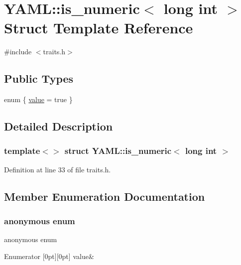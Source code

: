 \hypertarget{struct_y_a_m_l_1_1is__numeric_3_01long_01int_01_4}{}\section{Y\+A\+ML\+::is\+\_\+numeric$<$ long int $>$ Struct Template Reference}
\label{struct_y_a_m_l_1_1is__numeric_3_01long_01int_01_4}


{\ttfamily \#include $<$traits.\+h$>$}

\subsection*{Public Types}
\begin{DoxyCompactItemize}
\item 
enum \{ \mbox{\hyperlink{struct_y_a_m_l_1_1is__numeric_3_01long_01int_01_4_ad56b2b81b92aff41d3332b5f5948cccbac16c46732f20bdae796990235b2bb440}{value}} = true
 \}
\end{DoxyCompactItemize}


\subsection{Detailed Description}
\subsubsection*{template$<$$>$\newline
struct Y\+A\+M\+L\+::is\+\_\+numeric$<$ long int $>$}



Definition at line 33 of file traits.\+h.



\subsection{Member Enumeration Documentation}
\mbox{\label{struct_y_a_m_l_1_1is__numeric_3_01long_01int_01_4_ad56b2b81b92aff41d3332b5f5948cccb}} 
\subsubsection{\texorpdfstring{anonymous enum}{anonymous enum}}
{\footnotesize\ttfamily anonymous enum}

\begin{DoxyEnumFields}{Enumerator}
[0pt][0pt]{}\mbox{\label{struct_y_a_m_l_1_1is__numeric_3_01long_01int_01_4_ad56b2b81b92aff41d3332b5f5948cccbac16c46732f20bdae796990235b2bb440}} 
value&\\
\hline

\end{DoxyEnumFields}


